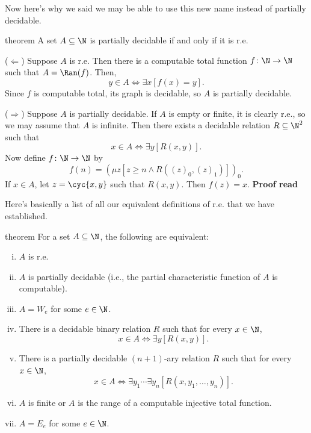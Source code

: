\documentclass[class=article, crop=false]{standalone}
\begin{document}
Now here's why we said we may be able to use this new name instead of partially decidable.
\begin{result}{theorem}
  A set $A \subseteq \N$ is partially decidable if and only if it is r.e.
\end{result}
\begin{pf}
  ($\Leftarrow$) Suppose $A$ is r.e. Then there is a computable total function $f \colon \N \to \N$ such that $A = \Ran(f)$. Then,
    \[
      y \in A \iff \exists x [f(x)=y].
    \]
  Since $f$ is computable total, its graph is decidable, so $A$ is partially decidable.

  ($\Rightarrow$) Suppose $A$ is partially decidable. If $A$ is empty or finite, it is clearly r.e., so we may assume that $A$ is infinite. Then there exists a decidable relation $R \subseteq \N^2$ such that
    \[
      x \in A \iff \exists y [R(x,y)].
    \]
  Now define $f \colon \N \to \N$ by
    \[
      f(n) = (\mu z [ z \geq n \land R((z)_0,(z)_1)])_0.
    \]
  If $x \in A$, let $z = \cyc{x,y}$ such that $R(x,y)$. Then $f(z) = x$. \textbf{Proof read}
\end{pf}

Here's basically a list of all our equivalent definitions of r.e. that we have established.
\begin{result}{theorem}
  For a set $A \subseteq \N$, the following are equivalent:
  \begin{enumerate}[(i)]
    \item $A$ is r.e.
    \item $A$ is partially decidable (i.e., the partial characteristic function of $A$ is computable).
    \item $A = W_e$ for some $e \in \N$.
    \item There is a decidable binary relation $R$ such that for every $x \in \N$,
      \[
        x \in A \iff \exists y [R(x,y)].
      \]
    \item There is a partially decidable $(n+1)$-ary relation $R$ such that for every $x \in \N$,
      \[
        x \in A \iff \exists y_1 \cdots \exists y_n [R(x,y_1, \ldots, y_n)].
      \]
    \item $A$ is finite or $A$ is the range of a computable injective total function.
    \item $A = E_e$ for some $e \in \N$.
  \end{enumerate}
\end{result}
\end{document}
